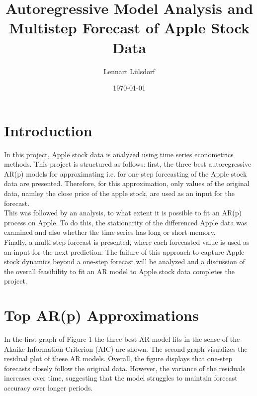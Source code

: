 \documentclass{article}
\begin{document}
\title{Autoregressive Model Analysis and Multistep Forecast of Apple Stock Data}
\author{Lennart Lülsdorf}
\date{\today}

\maketitle




\tableofcontents
\listoffigures
\listoftables

\newpage
{}

\section{Introduction}

In this project, Apple stock data is analyzed using time series econometrics methods. This
project is structured as follows: first, the three best autoregressive AR(p) models for approximating
i.e. for one step forecasting of the Apple stock data are presented. Therefore, for this approximation, only values
of the original data, namley the close price of the apple stock, are used as an input for the forecast.\\
This was followed by an analysis, to what extent it is possible to fit an AR(p) process on Apple.
To do this, the stationarity of the differenced Apple data was examined and also whether the time series has long or short memory.\\
Finally, a multi-step forecast is presented, where each forecasted value is used as an input
for the next prediction. The failure of this approach to capture Apple stock dynamics beyond a one-step forecast
will be analyzed and a discussion of the overall feasibility to fit an AR model to Apple stock data completes the project.

\section{Top AR(p) Approximations}

In the first graph of Figure 1 the three best AR model fits in the sense of the Akaike Information
Criterion (AIC) are shown. The second graph visualizes the residual plot of these AR models. Overall, the figure displays
that one-step forecasts closely follow the original data. However, the variance of the residuals
increases over time, suggesting that the model struggles to maintain forecast accuracy over
longer periods.
\end{document}

